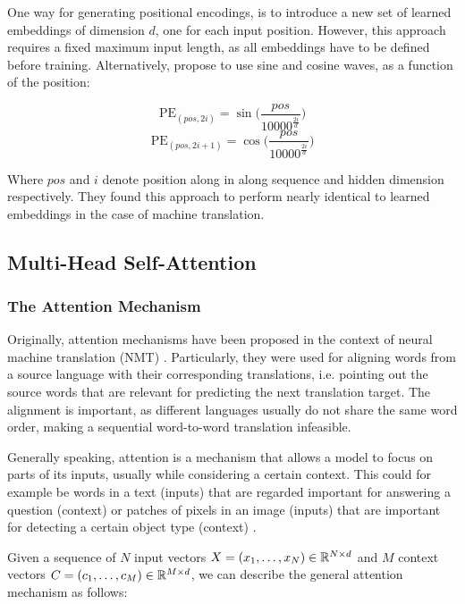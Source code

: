 One way for generating positional encodings, is to introduce a new set of learned embeddings of dimension $d$, one for each input position. However, this approach requires a fixed maximum input length, as all embeddings have to be defined before training. Alternatively, \cite{vaswani2017attention} propose to use sine and cosine waves, as a function of the position:

\begin{equation}
    \text{PE}_{(pos, 2i)} = \sin\bigg(\frac{pos}{10000^{\frac{2i}{d}}}\bigg)
\end{equation}
\begin{equation}
    \text{PE}_{(pos, 2i + 1)} = \cos\bigg(\frac{pos}{10000^{\frac{2i}{d}}}\bigg)
\end{equation}

Where $pos$ and $i$ denote position along in along sequence and hidden dimension respectively. They found this approach to perform nearly identical to learned embeddings in the case of machine translation.

\subsection{Multi-Head Self-Attention}
\subsubsection{The Attention Mechanism}
Originally, attention mechanisms have been proposed in the context of neural machine translation (NMT) \cite{bahdanau2014neural,luong2015effective}. Particularly, they were used for aligning words from a source language with their corresponding translations, i.e. pointing out the source words that are relevant for predicting the next translation target. The alignment is important, as different languages usually do not share the same word order, making a sequential word-to-word translation infeasible.

Generally speaking, attention is a mechanism that allows a model to focus on parts of its inputs, usually while considering a certain context. This could for example be words in a text (inputs) that are regarded important for answering a question (context) \cite{xiong2016dynamic} or patches of pixels in an image (inputs) that are important for detecting a certain object type (context) \cite{xu2015show}.

Given a sequence of $N$ input vectors $X = (x_1, \dots, x_N) \in \mathbb{R}^{N \times d}$ and $M$ context vectors $C = (c_1, \dots, c_M) \in \mathbb{R}^{M \times d}$, we can describe the general attention mechanism as follows:

